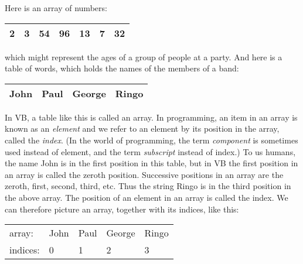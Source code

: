 		Here is an array of numbers:
		\begin{center}
			\begin{tabular}{|l|l|l|l|l|l|l|}
				\hline 2& 3	&54&	96&	13&	7&	32 \\ \hline
			\end{tabular}
		\end{center}
		which might represent the ages of a group of people at a party. And here is a table of words, which holds the names of the members of a band:
		\begin{center}
			\begin{tabular}{|l|l|l|l|}
				\hline John&	Paul&	George &	Ringo\\ \hline
			\end{tabular}
		\end{center}
		In VB, a table like this is called an array. In programming, an item in an array is known as an \emph{element} and we refer to an element by its position in the array, called the \emph{index}. (In the world of programming, the term \emph{component} is sometimes used instead of element, and the term \emph{subscript} instead of index.) To us humans, the name John is in the first position in this table, but in VB the first position in an array is called the zeroth position. Successive positions in an array are the zeroth, first, second, third, etc. Thus the string Ringo is in the third position in the above array. The position of an element in an array is called the index. We can therefore picture an array, together with its indices, like this:
		\begin{center}
			\begin{tabular}{l |l|l|l|l|}
				\cline{2-5}
				array: &	John	&Paul&	George&	Ringo\\ \cline{2-5}
			\multicolumn{1}{l}{indices:} &	\multicolumn{1}{l}{0} &	\multicolumn{1}{l}{1} &	\multicolumn{1}{l}{2}  &	\multicolumn{1}{l}{3} 
			\end{tabular}
		\end{center}


